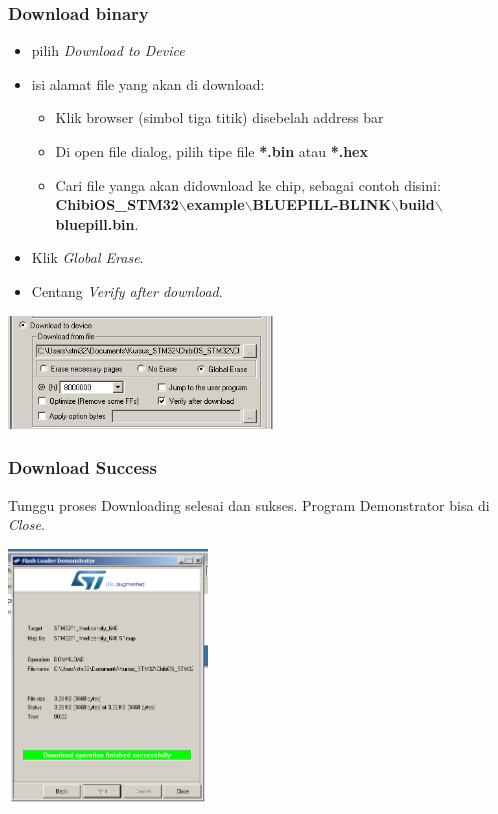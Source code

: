 \documentclass[table,dvipsnames]{beamer}
\begin{document}
	\begin{frame}
		\frametitle{Download binary}
		\begin{exampleblock}{}
			\begin{itemize}
				\item pilih \textit{Download to Device}
				\item isi alamat file yang akan di download:
				\begin{itemize}
					\item Klik browser (simbol tiga titik) disebelah address bar
					\item Di open file dialog, pilih tipe file \textbf{*.bin} atau \textbf{*.hex}
					\item Cari file yanga akan didownload ke chip, sebagai contoh disini:\\
					\textbf{ChibiOS\_STM32$\backslash$example$\backslash$BLUEPILL-BLINK$\backslash$build$\backslash$bluepill.bin}.
				\end{itemize}
				\item Klik \textit{Global Erase}.
				\item Centang \textit{Verify after download}.
			\end{itemize}
		\end{exampleblock}
		\begin{center}
			\includegraphics[width=200pt]{images/demons3}
		\end{center}
	\end{frame}

	\begin{frame}
		\frametitle{Download Success}
		\begin{exampleblock}{}
			Tunggu proses Downloading selesai dan sukses.
			Program Demonstrator bisa di \textit{Close}.
		\end{exampleblock}
		\begin{center}
			\includegraphics[width=150pt]{images/demons4}
		\end{center}
	\end{frame}
\end{document}
